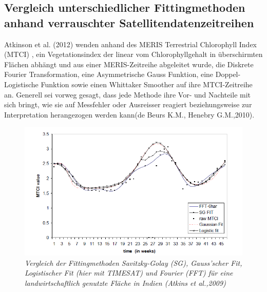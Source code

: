 \documentclass[11pt]{report}
\begin{document}
%
\subsection{Vergleich unterschiedlicher Fittingmethoden anhand verrauschter Satellitendatenzeitreihen}
Atkinson et al. (2012) wenden anhand des MERIS Terrestrial Chlorophyll Index (MTCI) , ein Vegetationsindex der linear vom Chlorophyllgehalt in überschirmten Flächen abhängt und aus einer MERIS-Zeitreihe abgeleitet wurde, die Diskrete Fourier Transformation, eine Asymmetrische Gauss Funktion, eine Doppel-Logistische Funktion sowie einen Whittaker Smoother auf ihre MTCI-Zeitreihe an. Generell sei vorweg gesagt, dass jede Methode ihre Vor- und Nachteile mit sich bringt, wie sie auf Messfehler oder Ausreisser reagiert beziehungsweise zur Interpretation herangezogen werden kann(de Beurs K.M., Henebry G.M.,2010). \newline

\begin{figure}[H]		%
\centering
\includegraphics[scale=0.6]{./Grafiken/Fitting/Atkinson_et_al_Vergleich_FFT_SG_LOG_GAU_.png}
\caption{\textit{Vergleich der Fittingmethoden Savitzky-Golay (SG), Gauss'scher Fit, Logistischer Fit (hier mit TIMESAT) und Fourier (FFT) für eine landwirtschaftlich genutzte Fläche in Indien (Atkins et al.,2009)}}
\end{figure}
\end{document}
